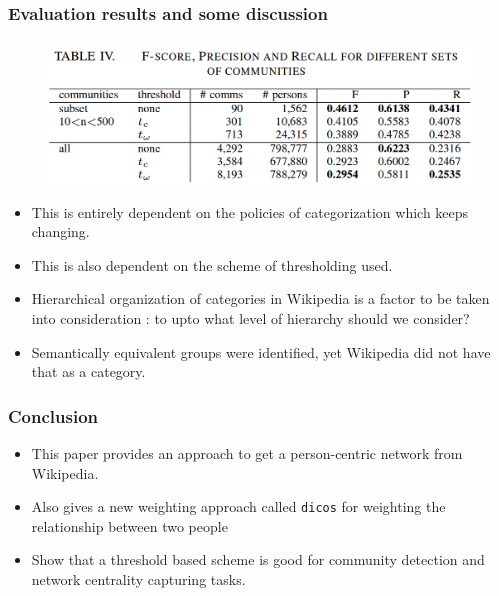 \documentclass[10pt, compress]{beamer}
\begin{document}
\begin{frame}[fragile]
	\frametitle{Evaluation results and some discussion}
\vspace{-10mm}
\begin{figure}
	\centering
    \includegraphics[width=0.75\linewidth]{table-eval.png}
\end{figure}
\begin{itemize}
\item This is entirely dependent on the policies of categorization which keeps changing.
\item This is also dependent on the scheme of thresholding used.
\item Hierarchical organization of categories in Wikipedia is a factor to be taken into consideration : to upto what level of hierarchy should we consider?
\item Semantically equivalent groups were identified, yet Wikipedia did not have that as a category.
\end{itemize}
\end{frame}

\begin{frame}[fragile]
	\frametitle{Conclusion}
\begin{itemize}
\item This paper provides an approach to get a person-centric network from Wikipedia.
\item Also gives a new weighting approach called \texttt{dicos} for weighting the relationship between two people
\item Show that a threshold based scheme is good for community detection and network centrality capturing tasks.
\end{itemize}
\end{frame}

\end{document}
